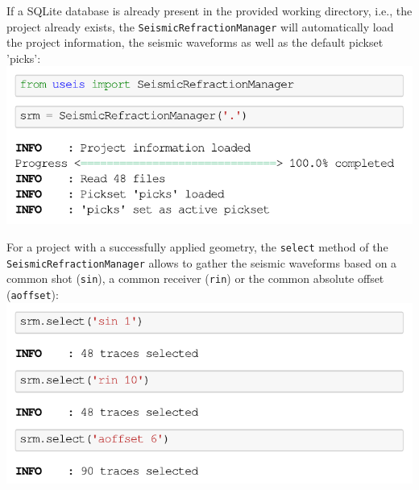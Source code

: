 \documentclass[a4paper,fleqn]{cas-sc}
\begin{document}
If a SQLite database is already present in the provided working directory, i.e., the project already exists, the \texttt{SeismicRefractionManager} will automatically load the project information, the seismic waveforms as well as the default pickset 'picks':
\newline
\includegraphics[width=.5\textwidth]{./figures/load_project.pdf}

For a project with a successfully applied geometry, the \texttt{select} method of the \texttt{SeismicRefractionManager} allows to gather the seismic waveforms based on a common shot (\texttt{sin}), a common receiver (\texttt{rin}) or the common absolute offset (\texttt{aoffset}):
\newline
\includegraphics[width=.5\textwidth]{./figures/select.pdf}
\end{document}
